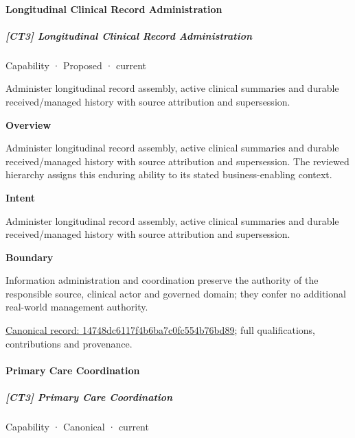 \paragraph{Longitudinal Clinical Record Administration}

\subparagraph{[CT3] Longitudinal Clinical Record Administration}

\label{element:14748dc6117f4b6ba7c0fc554b76bd89}
{\small Capability · Proposed · current}\par

Administer longitudinal record assembly, active clinical summaries and durable received/managed history with source attribution and supersession.



\textbf{Overview}



Administer longitudinal record assembly, active clinical summaries and durable received/managed history with source attribution and supersession. The reviewed hierarchy assigns this enduring ability to its stated business-enabling context.



\textbf{Intent}



Administer longitudinal record assembly, active clinical summaries and durable received/managed history with source attribution and supersession.



\textbf{Boundary}



Information administration and coordination preserve the authority of the responsible source, clinical actor and governed domain; they confer no additional real-world management authority.


{\footnotesize \href{../../../../continuum/strategy/capability/14748dc6117f4b6ba7c0fc554b76bd89.md}{Canonical record: 14748dc6117f4b6ba7c0fc554b76bd89}; full qualifications, contributions and provenance.}\par
\paragraph{Primary Care Coordination}

\subparagraph{[CT3] Primary Care Coordination}

\label{element:f80e73ee91624ce5baa11ae15480fd35}
{\small Capability · Canonical · current}\par

